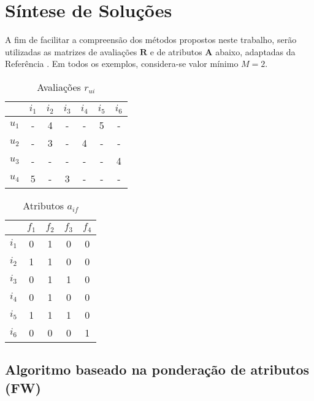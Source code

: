 \chapter[Síntese de Soluções]{Síntese de Soluções}
\label{chap:sintese_de_solucoes}

A fim de facilitar a compreensão dos métodos propostos neste trabalho, serão utilizadas as matrizes de avaliações $\mathbf{R}$ e de atributos $\mathbf{A}$ abaixo, adaptadas da Referência . Em todos os exemplos, considera-se valor mínimo $M=2$.

\begin{table}[h]
\begin{center}
    \caption{Avaliações $r_{ui}$}
    \label{tab:rui_ref}
    \begin{tabular}{ | c | c | c | c | c | c | c | } 
    \hline
     & $i_1$ & $i_2$ & $i_3$ & $i_4$ & $i_5$ & $i_6$ \\ \hline
     $u_1$ & - & 4 & - & - & 5 & - \\ \hline
     $u_2$ & - & 3 & - & 4 & - & - \\ \hline
     $u_3$ & - & - & - & - & - & 4 \\ \hline
     $u_4$ & 5 & - & 3 & - & - & - \\ \hline
    \end{tabular}
\end{center}
\end{table}

\begin{table}[h]
\begin{center}
    \caption{Atributos $a_{if}$}
    \label{tab:aif_ref}
    \begin{tabular}{ | c | c | c | c | c | } 
    \hline
     & $f_1$ & $f_2$ & $f_3$ & $f_4$  \\ \hline
     $i_1$ & 0 & 1 & 0 & 0  \\ \hline
     $i_2$ & 1 & 1 & 0 & 0  \\ \hline
     $i_3$ & 0 & 1 & 1 & 0  \\ \hline
     $i_4$ & 0 & 1 & 0 & 0  \\ \hline
     $i_5$ & 1 & 1 & 1 & 0  \\ \hline
     $i_6$ & 0 & 0 & 0 & 1  \\ \hline
    \end{tabular}
\end{center}
\end{table}

\section{Algoritmo baseado na ponderação de atributos (FW)} %
\label{sec:algoritmo_baseado_na_pondera_o_de_atributos_}

